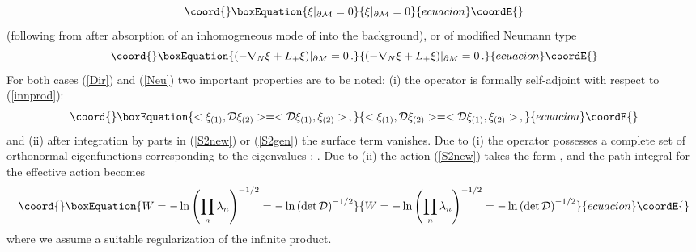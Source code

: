 \documentclass[a4paper,12pt]{article}
\providecommand{\oB}{|_{\partial{\cal M}}}
\begin{document}
\begin{equation}\coord{}\boxEquation{
\xi \oB =0 \label{Dir}
}{
\xi \oB =0 }{ecuacion}\coordE{}\end{equation}
(following from \coordHE{} after absorption
of an inhomogeneous mode of \myHighlight{$\xi$}\coordHE{} into the background),
or of modified Neumann type
\begin{equation}\coord{}\boxEquation{
(-\nabla_N \xi +L_+\xi ) \vert_{\partial M} =0 \label{Neu} \,.
}{
(-\nabla_N \xi +L_+\xi ) \vert_{\partial M} =0 \,.
}{ecuacion}\coordE{}\end{equation}
For both cases (\ref{Dir}) and (\ref{Neu})
two  important properties are to be noted:  (i) the operator
\coordHE{} is formally self-adjoint with respect to (\ref{innprod}):
\begin{equation}\coord{}\boxEquation{
<\xi_{(1)},{\cal D}\xi_{(2)}>=<{\cal D}\xi_{(1)}, \xi_{(2)}>\, ,
\label{self}
}{
<\xi_{(1)},{\cal D}\xi_{(2)}>=<{\cal D}\xi_{(1)}, \xi_{(2)}>\, ,
}{ecuacion}\coordE{}\end{equation}
and (ii) after integration by parts in (\ref{S2new}) 
or (\ref{S2gen}) the surface
term vanishes. Due to (i) the operator \coordHE{} possesses a complete set of
orthonormal eigenfunctions \coordHE{} corresponding to the eigenvalues
\coordHE{}: \coordHE{}. 
Due to (ii) the action (\ref{S2new}) takes the form
\coordHE{}, and the path integral 
for the effective action \coordHE{} becomes 
\begin{equation}\coord{}\boxEquation{
W=-\ln \left( \prod_n \lambda_n \right)^{-1/2}=
-\ln \left( \det {\cal D} \right)^{-1/2} \label{pathint}
}{
W=-\ln \left( \prod_n \lambda_n \right)^{-1/2}=
-\ln \left( \det {\cal D} \right)^{-1/2} }{ecuacion}\coordE{}\end{equation}  
where we assume a suitable regularization of the infinite
product. 
\end{document}
